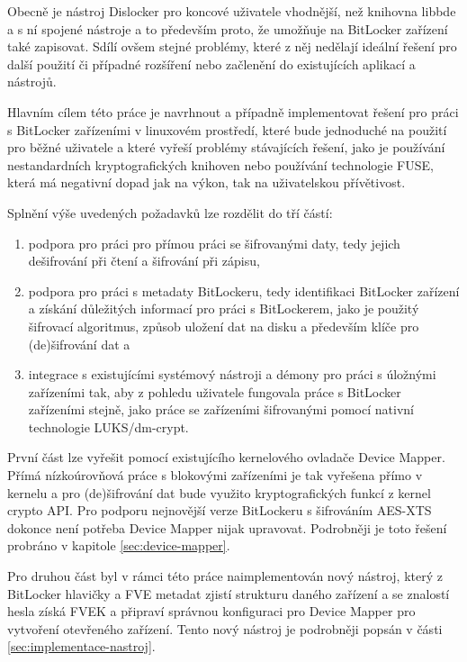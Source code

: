 Obecně je nástroj Dislocker pro koncové uživatele vhodnější, než knihovna libbde a s ní spojené nástroje a to především proto, že umožňuje na BitLocker zařízení také zapisovat. Sdílí ovšem stejné problémy, které z něj nedělají ideální řešení pro další použití či případné rozšíření nebo začlenění do existujících aplikací a nástrojů.




Hlavním cílem této práce je navrhnout a případně implementovat řešení pro práci s BitLocker zařízeními v linuxovém prostředí, které bude jednoduché na použití pro běžné uživatele a které vyřeší problémy stávajících řešení, jako je používání nestandardních kryptografických knihoven nebo používání technologie FUSE, která má negativní dopad jak na výkon, tak na uživatelskou přívětivost.

Splnění výše uvedených požadavků lze rozdělit do tří částí:

\begin{enumerate}
	\item podpora pro práci pro přímou práci se šifrovanými daty, tedy jejich dešifrování při čtení a šifrování při zápisu,
	\item podpora pro práci s metadaty BitLockeru, tedy identifikaci BitLocker zařízení a získání důležitých informací pro práci s BitLockerem, jako je použitý šifrovací algoritmus, způsob uložení dat na disku a především klíče pro (de)šifrování dat a
	\item integrace s existujícími systémový nástroji a démony pro práci s úložnými zařízeními tak, aby z pohledu uživatele fungovala práce s BitLocker zařízeními stejně, jako práce se zařízeními šifrovanými pomocí nativní technologie LUKS/dm-crypt.
\end{enumerate}

První část lze vyřešit pomocí existujícího kernelového ovladače Device Mapper. Přímá nízkoúrovňová práce s blokovými zařízeními je tak vyřešena přímo v kernelu a pro (de)šifrování dat bude využito kryptografických funkcí z kernel crypto API. Pro podporu nejnovější verze BitLockeru s šifrováním AES-XTS dokonce není potřeba Device Mapper nijak upravovat. Podrobněji je toto řešení probráno v kapitole \ref{sec:device-mapper}.

Pro druhou část byl v rámci této práce naimplementován nový nástroj, který z BitLocker hlavičky a FVE metadat zjistí strukturu daného zařízení a se znalostí hesla získá FVEK a připraví správnou konfiguraci pro Device Mapper pro vytvoření otevřeného zařízení. Tento nový nástroj je podrobněji popsán v části \ref{sec:implementace-nastroj}.

